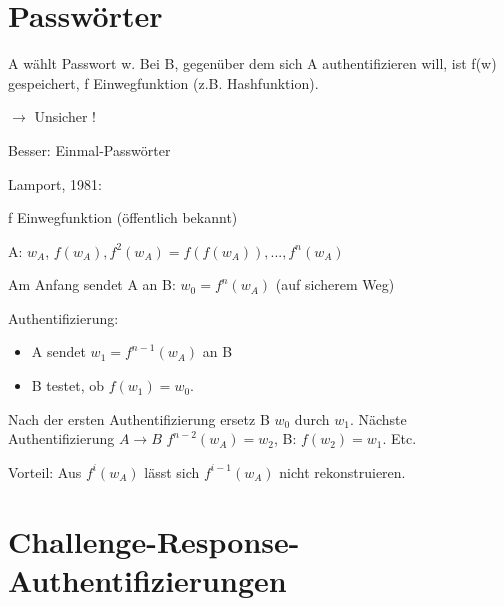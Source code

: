   \section{Passwörter}

  A wählt Passwort w. Bei B, gegenüber dem sich A authentifizieren will, ist f(w) gespeichert, f Einwegfunktion (z.B. Hashfunktion).

  \par \medskip

  $\rightarrow$ Unsicher !

  \par \medskip

  \par \medskip

  Besser: Einmal-Passwörter

  \par \medskip

  \par \medskip

  Lamport, 1981:

  f Einwegfunktion (öffentlich bekannt)

  A: $w_A$, $f(w_A), f^2(w_A) = f(f(w_A)), ..., f^n(w_A)$

  Am Anfang sendet A an B: $w_0 = f^n(w_A)$ (auf sicherem Weg)

  \newpage

  Authentifizierung: 

  \begin{itemize}
    \item A sendet $w_1 = f^{n-1}(w_A)$ an B

    \item B testet, ob $f(w_1) = w_0$.

  \end{itemize}

  Nach der ersten Authentifizierung ersetz B $w_0$ durch $w_1$. Nächste Authentifizierung $A \rightarrow B$ $f^{n-2}(w_A) = w_2$, B: $f(w_2) = w_1$. Etc.

  \par \medskip

  \par \medskip

  Vorteil: Aus $f^i(w_A)$ lässt sich $f^{i-1}(w_A)$ nicht rekonstruieren.

  \section{Challenge-Response-Authentifizierungen}

